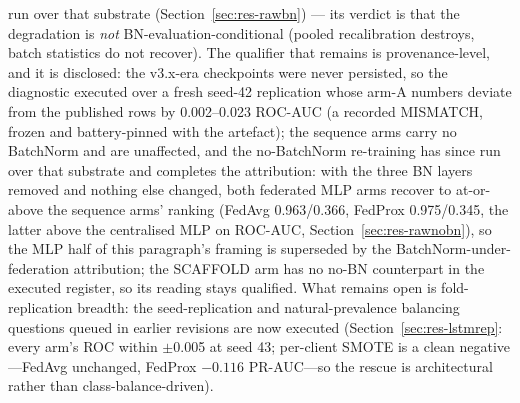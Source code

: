 run over that substrate (Section~\ref{sec:res-rawbn}) --- its verdict
is that the degradation is \emph{not} BN-evaluation-conditional (pooled
recalibration destroys, batch statistics do not recover). The
qualifier that remains is provenance-level, and it is disclosed: the
v3.x-era checkpoints were never persisted, so the diagnostic executed
over a fresh seed-42 replication whose arm-A numbers deviate from the
published rows by 0.002--0.023 ROC-AUC (a recorded MISMATCH, frozen
and battery-pinned with the artefact); the sequence arms carry no
BatchNorm and are unaffected, and the no-BatchNorm re-training has
since run over that substrate and completes the attribution: with
the three BN layers removed and nothing else changed, both federated
MLP arms recover to at-or-above the sequence arms' ranking (FedAvg
0.963/0.366, FedProx 0.975/0.345, the latter above the centralised
MLP on ROC-AUC, Section~\ref{sec:res-rawnobn}), so the MLP half of
this paragraph's framing is superseded by the
BatchNorm-under-federation attribution; the SCAFFOLD arm has no
no-BN counterpart in the executed register, so its reading stays
qualified.
What remains open is fold-replication breadth: the seed-replication
and natural-prevalence balancing questions queued in earlier
revisions are now executed (Section~\ref{sec:res-lstmrep}: every
arm's ROC within $\pm$0.005 at seed 43; per-client SMOTE is a
clean negative---FedAvg unchanged, FedProx $-0.116$ PR-AUC---so
the rescue is architectural rather than class-balance-driven).

